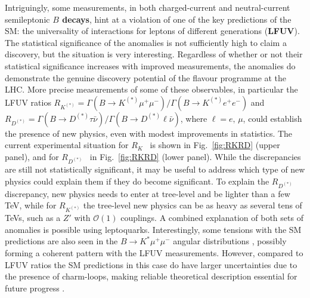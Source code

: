 Intriguingly, some measurements, in both charged-current and neutral-current 
semileptonic \textbf{$B$ decays}, hint at a violation of one of the 
key predictions of the SM: the universality of interactions for leptons of different generations (\textbf{LFUV}). 
The statistical significance of the anomalies is not sufficiently high to 
claim a discovery, but the situation is very interesting. Regardless of whether or not their statistical significance increases with improved measurements, the anomalies do demonstrate the genuine discovery potential of the flavour programme at the LHC.
More precise measurements of some of these observables, in particular the  
 LFUV ratios
$R_{K^{(*)}} = \Gamma(B\to K^{(*)} \mu^+\mu^-) / \Gamma(B\to K^{(*)} e^+e^-)$ and 
$R_{D^{(*)}} = \Gamma(B\to D^{(*)} \tau\bar\nu) / \Gamma(B\to D^{(*)} \ell\bar\nu)$, where $\ell=e,\, \mu$,
could establish the presence of new physics, even 
with modest improvements in statistics.  
The current experimental situation for 
$R_{K}$~\cite{PhysRevLett.103.171801, PhysRevD.86.032012,PhysRevLett.113.151601,Aaij:2019wad,Abdesselam:2019wac} is shown in Fig.~\ref{fig:RKRD} (upper panel), and for $R_{D^{(*)}}$~\cite{Abdesselam:2019dgh,PhysRevD.97.072013,PhysRevLett.118.211801, PhysRevLett.115.111803,PhysRevD.94.072007,PhysRevD.92.072014,PhysRevD.88.072012,PhysRevLett.109.101802,Aaij:2017uff} in Fig.~\ref{fig:RKRD} (lower panel). While the discrepancies are still not statistically significant, it may be useful to address which type of new physics could explain them if they do become significant.  
To explain the $R_{D^{(*)}}$ discrepancy, new physics needs to enter at tree-level and be lighter than a few TeV, while for $R_{K^{(*)}}$ the tree-level new physics can be as heavy as several tens of TeVs, such as a $Z'$ with ${\mathcal O}(1)$ couplings. A combined explanation of both sets of anomalies is possible using leptoquarks. 
Interestingly, some tensions with the SM predictions are also seen in the $B \to K^{*} \mu^+\mu^-$ angular distributions \cite{Aaij:2015oid,Wehle:2016yoi,Sirunyan:2017dhj,Aaboud:2018krd}, possibly forming a coherent pattern with the LFUV measurements. However, compared to LFUV ratios the SM predictions in this case do have larger uncertainties due to the presence of charm-loops, making reliable theoretical description essential for future progress \cite{Jager:2012uw,Ciuchini:2017mik,Matias:2012xw,DescotesGenon:2012zf,Bobeth:2017vxj}.

